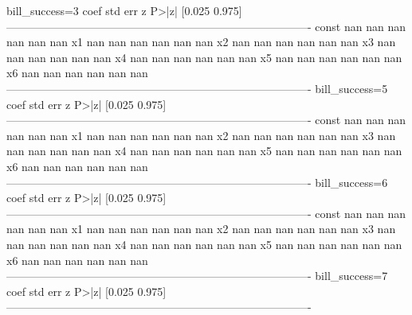 \begin{pyprint}
bill_success=3       coef    std err          z      P>|z|      [0.025      0.975]
----------------------------------------------------------------------------------
const                 nan        nan        nan        nan         nan         nan
x1                    nan        nan        nan        nan         nan         nan
x2                    nan        nan        nan        nan         nan         nan
x3                    nan        nan        nan        nan         nan         nan
x4                    nan        nan        nan        nan         nan         nan
x5                    nan        nan        nan        nan         nan         nan
x6                    nan        nan        nan        nan         nan         nan
----------------------------------------------------------------------------------
bill_success=5       coef    std err          z      P>|z|      [0.025      0.975]
----------------------------------------------------------------------------------
const                 nan        nan        nan        nan         nan         nan
x1                    nan        nan        nan        nan         nan         nan
x2                    nan        nan        nan        nan         nan         nan
x3                    nan        nan        nan        nan         nan         nan
x4                    nan        nan        nan        nan         nan         nan
x5                    nan        nan        nan        nan         nan         nan
x6                    nan        nan        nan        nan         nan         nan
----------------------------------------------------------------------------------
bill_success=6       coef    std err          z      P>|z|      [0.025      0.975]
----------------------------------------------------------------------------------
const                 nan        nan        nan        nan         nan         nan
x1                    nan        nan        nan        nan         nan         nan
x2                    nan        nan        nan        nan         nan         nan
x3                    nan        nan        nan        nan         nan         nan
x4                    nan        nan        nan        nan         nan         nan
x5                    nan        nan        nan        nan         nan         nan
x6                    nan        nan        nan        nan         nan         nan
----------------------------------------------------------------------------------
bill_success=7       coef    std err          z      P>|z|      [0.025      0.975]
----------------------------------------------------------------------------------

\end{pyprint}
